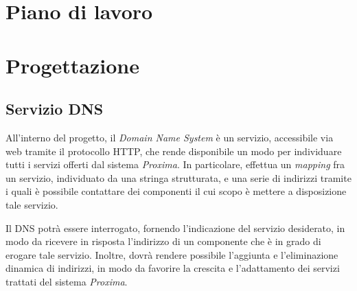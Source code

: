 \documentclass[a4paper,12pt]{report}
\begin{document}
\chapter{Piano di lavoro}

\chapter{Progettazione}

\section{Servizio DNS}
All'interno del progetto, il \emph{Domain Name System} è un servizio, accessibile via web tramite il protocollo HTTP, che rende disponibile un modo per individuare tutti i servizi offerti dal sistema \emph{Proxima}. In particolare, effettua un \emph{mapping} fra un servizio, individuato da una stringa strutturata, e una serie di indirizzi tramite i quali è possibile contattare dei componenti il cui scopo è mettere a disposizione tale servizio. 

Il DNS potrà essere interrogato, fornendo l'indicazione del servizio desiderato, in modo da ricevere in risposta l'indirizzo di un componente che è in grado di erogare tale servizio. Inoltre, dovrà rendere possibile l'aggiunta e l'eliminazione dinamica di indirizzi, in modo da favorire la crescita e l'adattamento dei servizi trattati del sistema \emph{Proxima}.
\end{document}

